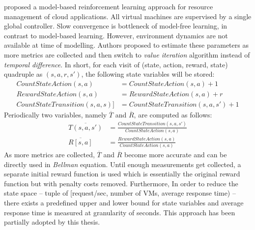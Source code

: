 \textcite{dutreilh:hal-01122123} proposed a model-based reinforcement learning approach for resource management of cloud applications. All virtual machines are supervised by a single global controller. Slow convergence is bottleneck of model-free learning, in contrast to model-based learning. However, environment dynamics are not available at time of modelling. Authors proposed to estimate these parameters as more metrics are collected and then switch to \emph{value iteration}\cite{rlIntro} algorithm instead of \emph{temporal difference}. In short, for each visit of (state, action, reward, state) quadruple as $(s,a,r,s')$, the following state variables will be stored:
\begin{align*}
CountStateAction(s,a)					&=	CountStateAction(s,a)+1\\
RewardStateAction(s,a)				&=	RewardStateAction(s,a)+r\\
CountStateTransition(s,a,s)]	&=	CountStateTransition(s,a,s')+1
\end{align*}
Periodically two variables, namely $\overline{T}$ and $\overline{R}$, are computed as follows:
\begin{align*}
\overline{T(s,a,s')}		&=	\frac{CountStateTransition(s,a,s')}{CountStateAction(s,a)}\\
\overline{R[s,a]}			&=	\frac{RewardStateAction(s,a)}{CountStateAction(s,a)}
\end{align*}
As more metrics are collected, $\overline{T}$ and $\overline{R}$ become more accurate and can be directly used in \emph{Bellman} equation. Until enough measurements get collected, a separate initial reward function is used which is essentially the original reward function but with penalty costs removed. Furthermore, In order to reduce the state space -- tuple of [request/sec, number of VMs, average response time) -- there exists a predefined upper and lower bound for state variables and average response time is measured at granularity of seconds. This approach has been partially adopted by this thesis.\newline

